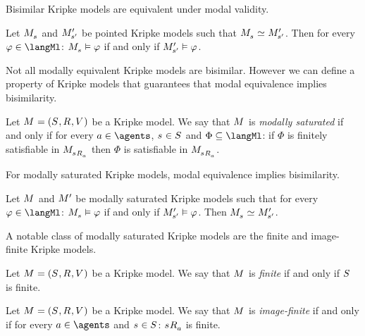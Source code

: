 Bisimilar Kripke models are equivalent under modal validity.

\begin{proposition}\label{modal-bisimulation-invariance}
Let $\kPModel{\kStateS}$ and ${M^{\prime}_{{s}^{\prime}}}$ be pointed Kripke models such that $\kPModel{\kStateS} \bisimilar \kPModelP{\kStateSP}$.
Then for every $\phi \in \langMl$:
$\kPModel{\kStateS} \entails \phi$ if and only if ${M^{\prime}_{{s}^{\prime}}} \vDash \varphi$.
\end{proposition}

Not all modally equivalent Kripke models are bisimilar.
However we can define a property of Kripke models that guarantees that modal equivalence implies bisimilarity.

\begin{definition}
Let $\kModelAndTuple$ be a Kripke model.
We say that $\kModel$ is {\em modally saturated} if and only if for every $\agentA \in \agents$, $\kStateS \in \kStates$ and $\Phi \subseteq \langMl$: if $\Phi$ is finitely satisfiable in $\kPModel{\kSuccessorsA{\kStateS}}$ then $\Phi$ is satisfiable in $\kPModel{\kSuccessorsA{\kStateS}}$.
\end{definition}

For modally saturated Kripke models, modal equivalence implies bisimilarity.

\begin{proposition}\label{modal-hennessy-milner}
Let $\kModel$ and ${M^{\prime}_{}}$ be modally saturated Kripke models such that for every $\phi \in \langMl$: $\kPModel{\kStateS} \entails \phi$ if and only if ${M^{\prime}_{{s}^{\prime}}} \vDash \varphi$.
Then $\kPModel{\kStateS} \bisimilar \kPModelP{\kStateSP}$.
\end{proposition}

A notable class of modally saturated Kripke models are the finite and image-finite Kripke models.

\begin{definition}
Let $\kModelAndTuple$ be a Kripke model.
We say that $\kModel$ is {\em finite} if and only if $\kStates$ is finite.
\end{definition}

\begin{definition}
Let $\kModelAndTuple$ be a Kripke model.
We say that $\kModel$ is {\em image-finite} if and only if for every $\agentA \in \agents$ and $\kStateS \in \kStates$: $\kSuccessorsA{\kStateS}$ is finite.
\end{definition}

